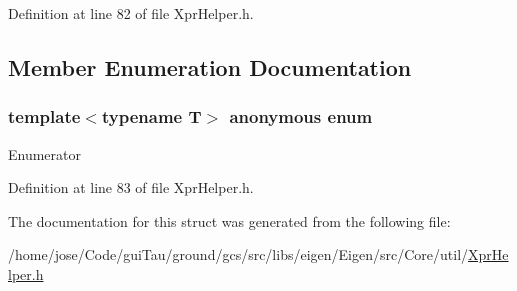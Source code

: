 Definition at line 82 of file Xpr\-Helper.\-h.



\subsection{Member Enumeration Documentation}
\hypertarget{structei__packet__traits_ae27daa8754b860d6cc58262fcd1709cb}{\subsubsection[{anonymous enum}]{\setlength{\rightskip}{0pt plus 5cm}template$<$typename T$>$ anonymous enum}}\label{structei__packet__traits_ae27daa8754b860d6cc58262fcd1709cb}
\begin{Desc}
\item[Enumerator]\par
\begin{description}
\item[{\em 
\hypertarget{structei__packet__traits_ae27daa8754b860d6cc58262fcd1709cba56d711a190b04b9dd1fd1517b57190c9}{size}\label{structei__packet__traits_ae27daa8754b860d6cc58262fcd1709cba56d711a190b04b9dd1fd1517b57190c9}
}]\end{description}
\end{Desc}


Definition at line 83 of file Xpr\-Helper.\-h.



The documentation for this struct was generated from the following file\-:\begin{DoxyCompactItemize}
\item 
/home/jose/\-Code/gui\-Tau/ground/gcs/src/libs/eigen/\-Eigen/src/\-Core/util/\hyperlink{_xpr_helper_8h}{Xpr\-Helper.\-h}\end{DoxyCompactItemize}

